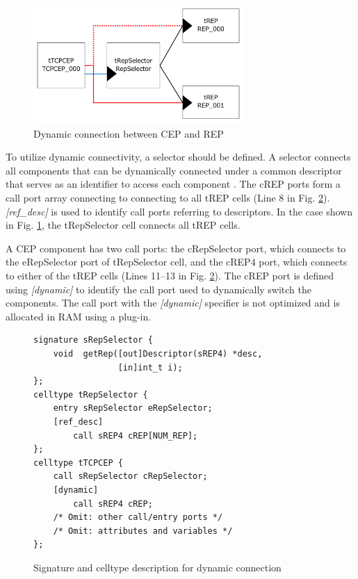 \documentclass[conference]{IEEEtran/IEEEtran}
\begin{document}
\begin{figure}[t]
    \centering
    \includegraphics[width=8.0cm,clip]{figure/DynamicConnectionUseCase.pdf}
    \vspace{-1mm} \caption{Dynamic connection between CEP and REP}
    \vspace{-1mm} \label{fig:DynamicConnectionUseCase}
\end{figure}

To utilize dynamic connectivity, a selector should be defined.
A selector connects all components that can be dynamically connected under a common descriptor that serves as an identifier to access each component \cite{par:optimization}.
The cREP ports form a call port array connecting to connecting to all tREP cells (Line 8 in Fig. \ref{src:DynamicCDLcode}).
{\it [ref\_desc]} is used to identify call ports referring to descriptors. 
In the case shown in Fig. \ref{fig:DynamicConnectionUseCase}, the tRepSelector cell connects all tREP cells.

A CEP component has two call ports: the cRepSelector port, which connects to the eRepSelector port of tRepSelector cell, and the cREP4 port, which connects to either of the tREP cells (Lines 11--13 in Fig. \ref{src:DynamicCDLcode}).
The cREP port is defined using {\it [dynamic]} to identify the call port used to dynamically switch the components.
The call port with the {\it [dynamic]} specifier is not optimized and is allocated in RAM using a plug-in.

\begin{figure}[t]
\centering
\begin{lstlisting}
signature sRepSelector {
    void  getRep([out]Descriptor(sREP4) *desc,
                 [in]int_t i);
};
celltype tRepSelector {
    entry sRepSelector eRepSelector;
    [ref_desc]
        call sREP4 cREP[NUM_REP];
};
celltype tTCPCEP {
    call sRepSelector cRepSelector;
    [dynamic]
        call sREP4 cREP;
    /* Omit: other call/entry ports */
    /* Omit: attributes and variables */
};
\end{lstlisting}
\vspace{-1mm} \caption{Signature and celltype description for dynamic connection}
\vspace{-1mm} \label{src:DynamicCDLcode}
\end{figure}
\end{document}
